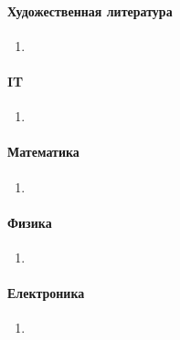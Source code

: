 \documentclass[a4paper, 11pt]{article}
\begin{document}
\paragraph{Художественная литература}
\begin{enumerate}
    \item
\end{enumerate}

\paragraph{IT}
\begin{enumerate}
    \item
\end{enumerate}

\paragraph{Математика}
\begin{enumerate}
    \item
\end{enumerate}

\paragraph{Физика}
\begin{enumerate}
    \item
\end{enumerate}

\paragraph{Електроника}
\begin{enumerate}
    \item
\end{enumerate}
\end{document}
